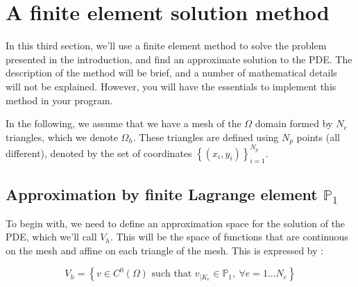\documentclass[english,10pt,a4paper]{article}
\begin{document}
\section{A finite element solution method}

In this third section, we'll use a finite element method to solve the problem presented in the introduction, and find an approximate solution to the PDE.
The description of the method will be brief, and a number of mathematical details will not be explained.
However, you will have the essentials to implement this method in your program.

In the following, we assume that we have a mesh of the $\Omega$ domain formed by $N_e$ triangles, which we denote $\Omega_h$.
These triangles are defined using $N_p$ points (all different), denoted by the set of coordinates $\left\{ (x_i,y_i) \right\}_{i=1}^{N_p}$.

\subsection{Approximation by finite Lagrange element $\mathbb{P}_1$}

To begin with, we need to define an approximation space for the solution of the PDE, which we'll call $V_h$.
This will be the space of functions that are continuous on the mesh and affine on each triangle of the mesh. This is expressed by :

\begin{equation*}
  V_h = \left\{ v \in C^0(\Omega) \text{ such that } v_{|K_e} \in \mathbb{P}_1, \ \forall e=1...N_e \right\}
\end{equation*}
\end{document}
